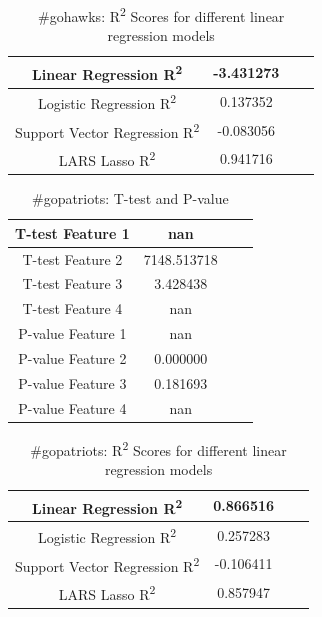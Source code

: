 \documentclass[12pt]{article}
\begin{document}
\begin{table}[H]
	\centering
	\begin{tabular}{| c | c | c | c |}
		\hline 
		Linear Regression R\textsuperscript2  & -3.431273 \\\hline
		Logistic Regression R\textsuperscript2  & 0.137352 \\\hline
		Support Vector Regression R\textsuperscript2  & -0.083056 \\\hline
		LARS Lasso R\textsuperscript2  & 0.941716 \\\hline
	\end{tabular} 
	\caption{\#gohawks: R\textsuperscript2 Scores for different linear regression models}
	\label{part1:tab1}
\end{table} 

\begin{table}[H]
	\centering
	\begin{tabular}{| c | c | c | c |}
		\hline 
		T-test Feature 1 & nan \\\hline
		T-test Feature 2 & 7148.513718 \\\hline
		T-test Feature 3 & 3.428438 \\\hline 
		T-test Feature 4 & nan \\\hline
		P-value Feature 1 & nan \\\hline
		P-value Feature 2 & 0.000000 \\\hline
		P-value Feature 3 & 0.181693 \\\hline
		P-value Feature 4 & nan \\\hline
	\end{tabular} 
	\caption{\#gopatriots: T-test and P-value}
	\label{part1:tab1}
\end{table} 


\begin{table}[H]
	\centering
	\begin{tabular}{| c | c | c | c |}
		\hline 
		Linear Regression R\textsuperscript2  & 0.866516 \\\hline
		Logistic Regression R\textsuperscript2  & 0.257283 \\\hline
		Support Vector Regression R\textsuperscript2  & -0.106411 \\\hline
		LARS Lasso R\textsuperscript2  & 0.857947 \\\hline
	\end{tabular} 
	\caption{\#gopatriots: R\textsuperscript2 Scores for different linear regression models}
	\label{part1:tab1}
\end{table} 
\end{document}
